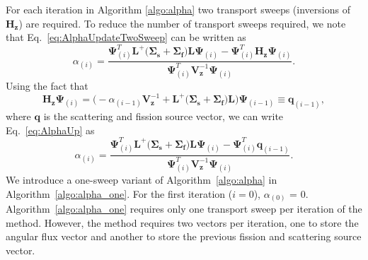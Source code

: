 For each iteration in Algorithm \ref{algo:alpha} two transport sweeps (inversions of $\mathbf{H_{z}}$) are required. To reduce the number of transport sweeps required, we note that Eq.~\ref{eq:AlphaUpdateTwoSweep} can be written as
\begin{equation}
	\alpha_{(i)} = \frac{ \mathbf{\Psi}^{T}_{(i)} \mathbf{L}^{+} \big ( \mathbf{\Sigma_{s}} + \mathbf{\Sigma_{f}} \big ) \mathbf{L} \mathbf{\Psi}_{(i)} -  \mathbf{\Psi}^{T}_{(i)}  \mathbf{H_{z}} \mathbf{\Psi}_{(i)}}{  \mathbf{\Psi}^{T}_{(i)} \mathbf{V}^{-1}_{\mathbf{z}}  \mathbf{\Psi}_{(i)}}.
	\label{eq:AlphaUp}
\end{equation}
Using the fact that 
\begin{equation}
\mathbf{H_{z}} \mathbf{\Psi}_{(i)} =  \bigg ( -\alpha_{(i-1)} \mathbf{V}_{\mathbf{z}}^{-1} + \mathbf{L}^{+} \big ( \mathbf{\Sigma_{s}} + \mathbf{\Sigma_{f}} \big ) \mathbf{L} \bigg ) \mathbf{\Psi}_{(i-1)} \equiv \mathbf{q}_{(i-1)},
\end{equation}
where $\mathbf{q}$ is the scattering and fission source vector, we can write Eq.~\ref{eq:AlphaUp} as
\begin{equation}
	\alpha_{(i)} = \frac{ \mathbf{\Psi}^{T}_{(i)} \mathbf{L}^{+} \big ( \mathbf{\Sigma_{s}} + \mathbf{\Sigma_{f}} \big ) \mathbf{L} \mathbf{\Psi}_{(i)} -  \mathbf{\Psi}^{T}_{(i)}  \mathbf{q}_{(i-1)}}{  \mathbf{\Psi}^{T}_{(i)} \mathbf{V}^{-1}_{\mathbf{z}}  \mathbf{\Psi}_{(i)}}.
\end{equation}
We introduce a one-sweep variant of Algorithm~\ref{algo:alpha} in Algorithm~\ref{algo:alpha_one}. For the first iteration ($i=0$), $\alpha_{(0)}$ = 0. Algorithm~\ref{algo:alpha_one} requires only one transport sweep per iteration of the method. However, the method requires two vectors per iteration, one to store the angular flux vector and another to store the previous fission and scattering source vector.
